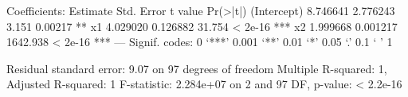 Coefficients:
            Estimate Std. Error  t value Pr(>|t|)    
(Intercept) 8.746641   2.776243    3.151  0.00217 ** 
x1          4.029020   0.126882   31.754  < 2e-16 ***
x2          1.999668   0.001217 1642.938  < 2e-16 ***
---
Signif. codes:  0 ‘***’ 0.001 ‘**’ 0.01 ‘*’ 0.05 ‘.’ 0.1 ‘ ’ 1

Residual standard error: 9.07 on 97 degrees of freedom
Multiple R-squared:      1,	Adjusted R-squared:      1 
F-statistic: 2.284e+07 on 2 and 97 DF,  p-value: < 2.2e-16

